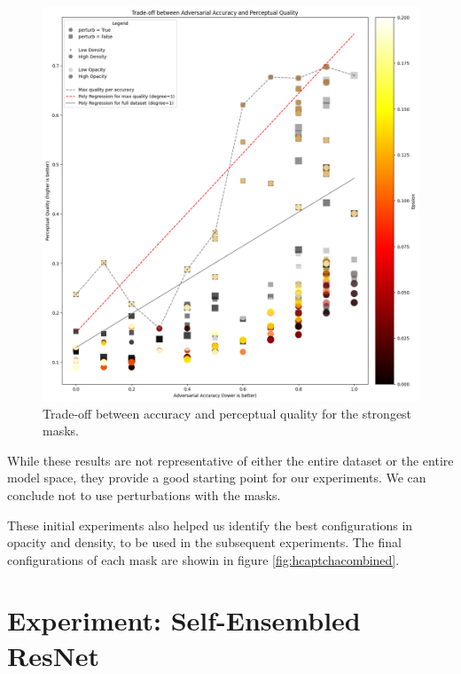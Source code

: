 \documentclass[a4paper, oneside]{discothesis}
\begin{document}
\begin{figure}
	\centering
	\includegraphics[width=1\columnwidth]{figures/tradeoff-2.png}
	\caption{Trade-off between accuracy and perceptual quality for the strongest masks.}
	\label{fig:tradeoff-2}
\end{figure}

While these results are not representative of either the entire dataset or the entire model space, they provide a good starting point for our experiments. We can conclude not to use perturbations with the masks.

These initial experiments also helped us identify the best configurations in opacity and density, to be used in the subsequent experiments. The final configurations of each mask are showin in figure \ref{fig:hcaptchacombined}.


% 
% 














\section{Experiment: Self-Ensembled ResNet}
\end{document}
